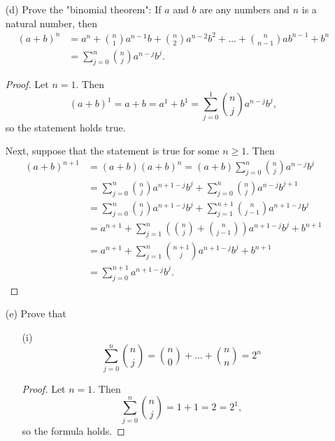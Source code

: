 \documentclass{article}
\begin{document}
\begin{enumerate}
	\begin{proof}
		The number of $k$-tuples of integers chosen from $1, \dots, n$ is $n(n - 1)\dots(n - k + 1)$, because there is $n$ choices for the first element, $n - 1$ choices for the second, etc. Now, for each $k$-tuple, it can be arranged in $k(k - 1)\dots(1) = k!$ different ways, so to get the number of sets of size $k$, with elements chosen from $1, \dots, n$, we have $\frac{n(n - 1)\dots(n - k + 1)}{k!} = \binom{n}{k}$.
	\end{proof}
	\item[(d)] Prove the "binomial theorem": If $a$ and $b$ are any numbers and $n$ is a natural number, then 
	\begin{align*}
		(a + b)^n &= a^n + \binom{n}{1}a^{n - 1}b + \binom{n}{2}a^{n-2}b^2 + \dots + \binom{n}{n - 1}ab^{n - 1} + b^n \\&=\sum_{j = 0}^{n}\binom{n}{j}a^{n - j}b^j.
	\end{align*}
	\begin{proof}
		Let $n = 1$. Then \[(a + b)^1 = a + b = a^1 + b^1 = \sum_{j = 0}^{1}\binom{n}{j}a^{n - j}b^j,\] so the statement holds true.

		Next, suppose that the statement is true for some $n \ge 1$. Then
		\begin{align*}
			(a + b)^{n + 1} &= (a + b)(a + b)^n = (a + b)\sum_{j = 0}^{n}\binom{n}{j}a^{n - j}b^j \\&= \sum_{j=0}^{n}\binom{n}{j}a^{n + 1 - j}b^j + \sum_{j=0}^{n}\binom{n}{j}a^{n - j}b^{j + 1} \\&= \sum_{j=0}^{n}\binom{n}{j}a^{n + 1 - j}b^j + \sum_{j = 1}^{n + 1}\binom{n}{j - 1}a^{n + 1 - j}b^j \\&= a^{n+1} + \sum_{j=1}^{n}(\binom{n}{j} + \binom{n}{j - 1})a^{n+1-j}b^j + b^{n + 1} \\&= a^{n+1} + \sum_{j=1}^{n}\binom{n+1}{j}a^{n+1-j}b^j + b^{n+1} \\&= \sum_{j=0}^{n+1}a^{n+1-j}b^j.
		\end{align*}
	\end{proof}
	\pagebreak
	\item[(e)] Prove that
	\begin{enumerate}
		\item[(i)] \[ \sum_{j=0}^{n}\binom{n}{j} = \binom{n}{0} + \dots + \binom{n}{n} = 2^n \]
		\begin{proof}
			Let $n = 1$. Then \[ \sum_{j = 0}^{n}\binom{n}{j} = 1 + 1 = 2 = 2^1, \]so the formula holds.


\end{proof}
\end{enumerate}
\end{enumerate}
\end{document}
